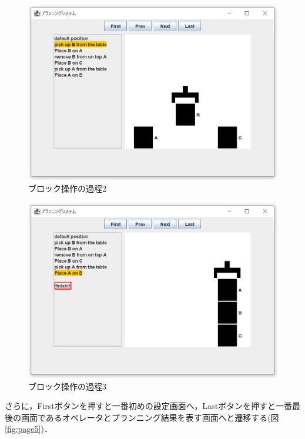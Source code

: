\documentclass[12pt]{jarticle}
\begin{document}
\begin{figure}[htbp]
  \begin{center}
    \includegraphics[scale=0.6]{images/page3.PNG}
    \caption{ブロック操作の過程2}
    \label{fig:page3}
  \end{center}
\end{figure}
\begin{figure}[htbp]
  \begin{center}
    \includegraphics[scale=0.6]{images/page4.PNG}
    \caption{ブロック操作の過程3}
    \label{fig:page4}
  \end{center}
\end{figure}
\clearpage
さらに，Firstボタンを押すと一番初めの設定画面へ，Lastボタンを押すと一番最後の画面であるオペレータとプランニング結果を表す画面へと遷移する(図\ref{fig:page5})．\\
\end{document}
